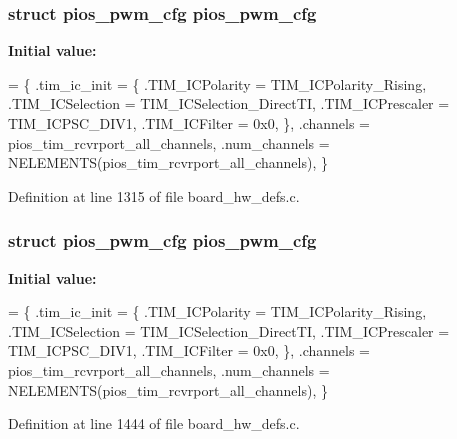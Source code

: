 \hypertarget{group___tau_labs_core_ga7587f8e174df90bef8cec1edfa9e14c1}{
\subsubsection[{pios\-\_\-pwm\-\_\-cfg}]{\setlength{\rightskip}{0pt plus 5cm}struct {\bf pios\-\_\-pwm\-\_\-cfg} {\bf pios\-\_\-pwm\-\_\-cfg}}}\label{group___tau_labs_core_ga7587f8e174df90bef8cec1edfa9e14c1}
{\bfseries Initial value\-:}
\begin{DoxyCode}
= \{
        .tim\_ic\_init = \{
                .TIM\_ICPolarity = TIM\_ICPolarity\_Rising,
                .TIM\_ICSelection = TIM\_ICSelection\_DirectTI,
                .TIM\_ICPrescaler = TIM\_ICPSC\_DIV1,
                .TIM\_ICFilter = 0x0,
        \},
        .channels = pios\_tim\_rcvrport\_all\_channels,
        .num\_channels = NELEMENTS(pios\_tim\_rcvrport\_all\_channels),
\}
\end{DoxyCode}


Definition at line 1315 of file board\-\_\-hw\-\_\-defs.\-c.

\hypertarget{group___tau_labs_core_ga7587f8e174df90bef8cec1edfa9e14c1}{
\subsubsection[{pios\-\_\-pwm\-\_\-cfg}]{\setlength{\rightskip}{0pt plus 5cm}struct {\bf pios\-\_\-pwm\-\_\-cfg} {\bf pios\-\_\-pwm\-\_\-cfg}}}\label{group___tau_labs_core_ga7587f8e174df90bef8cec1edfa9e14c1}
{\bfseries Initial value\-:}
\begin{DoxyCode}
= \{
        .tim\_ic\_init = \{
                .TIM\_ICPolarity = TIM\_ICPolarity\_Rising,
                .TIM\_ICSelection = TIM\_ICSelection\_DirectTI,
                .TIM\_ICPrescaler = TIM\_ICPSC\_DIV1,
                .TIM\_ICFilter = 0x0,
        \},
        .channels = pios\_tim\_rcvrport\_all\_channels,
        .num\_channels = NELEMENTS(pios\_tim\_rcvrport\_all\_channels),
\}
\end{DoxyCode}


Definition at line 1444 of file board\-\_\-hw\-\_\-defs.\-c.

